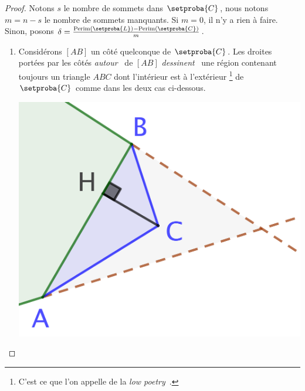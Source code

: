 \begin{proof}
	Notons $s$ le nombre de sommets dans $\setproba{C}$, nous notons $m = n - s$ le nombre de sommets manquants.
	Si $m = 0$, il n'y a rien à faire.
	Sinon, posons $\delta = \frac{\perim{\setproba{L}} - \perim{\setproba{C}}}{m}$.
	\begin{enumerate}
		\item \label{add-vertex-start}
		Considérons $[AB]$ un côté quelconque de $\setproba{C}$.
		Les droites portées par les côtés \og \emph{autour} \fg\ de $[AB]$ \og \emph{dessinent} \fg\ une région contenant toujours un triangle $ABC$ dont l'intérieur est à l'extérieur
		\footnote{
			C'est ce que l'on appelle de la \og \emph{low poetry} \fg\,.
		}
		de $\setproba{C}$ comme dans les deux cas ci-dessous.
		\begin{multicols}{2}
			\centering

			\includegraphics[scale=.4]{content/polygon/at-least-one/add-vertex-1.png}


\end{multicols}
\end{enumerate}
\end{proof}
